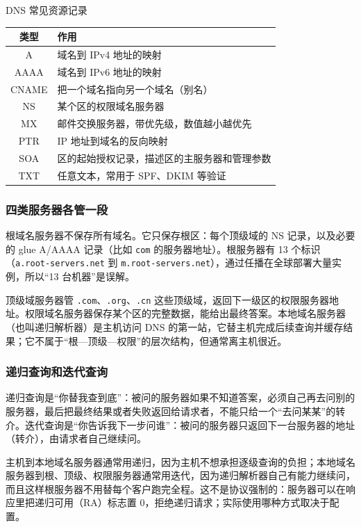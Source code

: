 \begin{tablebox}{DNS 常见资源记录}
\centering
\begin{tabularx}{\linewidth}{|c|X|}
\hline
\textbf{类型} & \textbf{作用} \\
\hline
A & 域名到 IPv4 地址的映射 \\
AAAA & 域名到 IPv6 地址的映射 \\
CNAME & 把一个域名指向另一个域名（别名） \\
NS & 某个区的权限域名服务器 \\
MX & 邮件交换服务器，带优先级，数值越小越优先 \\
PTR & IP 地址到域名的反向映射 \\
SOA & 区的起始授权记录，描述区的主服务器和管理参数 \\
TXT & 任意文本，常用于 SPF、DKIM 等验证 \\
\hline
\end{tabularx}
\end{tablebox}

\subsubsection{四类服务器各管一段}

根域名服务器不保存所有域名。它只保存根区：每个顶级域的 NS 记录，以及必要的 glue A/AAAA 记录（比如 \texttt{com} 的服务器地址）。根服务器有 13 个标识（\texttt{a.root-servers.net} 到 \texttt{m.root-servers.net}），通过任播在全球部署大量实例，所以“13 台机器”是误解。

顶级域服务器管 \texttt{.com}、\texttt{.org}、\texttt{.cn} 这些顶级域，返回下一级区的权限服务器地址。权限域名服务器保存某个区的完整数据，能给出最终答案。本地域名服务器（也叫递归解析器）是主机访问 DNS 的第一站，它替主机完成后续查询并缓存结果；它不属于“根—顶级—权限”的层次结构，但通常离主机很近。

\subsubsection{递归查询和迭代查询}

递归查询是“你替我查到底”：被问的服务器如果不知道答案，必须自己再去问别的服务器，最后把最终结果或者失败返回给请求者，不能只给一个“去问某某”的转介。迭代查询是“你告诉我下一步问谁”：被问的服务器只返回下一台服务器的地址（转介），由请求者自己继续问。

主机到本地域名服务器通常用递归，因为主机不想承担逐级查询的负担；本地域名服务器到根、顶级、权限服务器通常用迭代，因为递归解析器自己有能力继续问，而且这样根服务器不用替每个客户跑完全程。这不是协议强制的：服务器可以在响应里把递归可用（RA）标志置 0，拒绝递归请求；实际使用哪种方式取决于配置。

